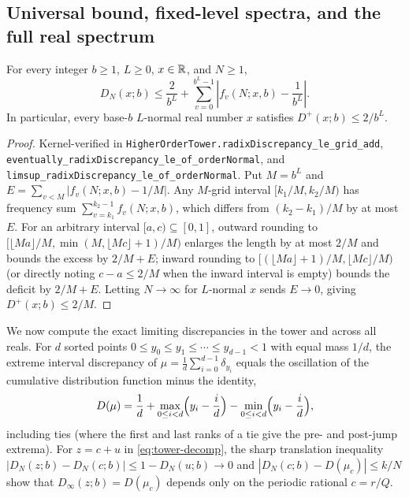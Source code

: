 \documentclass[11pt]{article}
\newcommand{\ttt}[1]{\texttt{#1}}
\begin{document}
\subsection{Universal bound, fixed-level spectra, and the full real spectrum}

\begin{theorem}\label{thm:universal-ceiling}
For every integer $b\ge1$, $L\ge0$, $x\in\mathbb R$, and $N\ge1$,
\[
D_N(x;b)\le\frac2{b^L}+\sum_{v=0}^{b^L-1}\left|f_v(N;x,b)-\frac1{b^L}\right|.
\]
In particular, every base-$b$ $L$-normal real number $x$ satisfies $D^+(x;b)\le 2/b^L$.
\end{theorem}

\begin{proof}
Kernel-verified in \ttt{HigherOrderTower.radixDiscrepancy\_le\_grid\_add}, \ttt{eventually\_radixDiscrepancy\_le\_of\_orderNormal}, and \ttt{limsup\_radixDiscrepancy\_le\_of\_orderNormal}. Put $M=b^L$ and $E=\sum_{v<M}|f_v(N;x,b)-1/M|$. Any $M$-grid interval $[k_1/M,k_2/M)$ has frequency sum $\sum_{v=k_1}^{k_2-1}f_v(N;x,b)$, which differs from $(k_2-k_1)/M$ by at most $E$. For an arbitrary interval $[a,c)\subseteq[0,1]$, outward rounding to $[\lfloor Ma\rfloor/M,\min(M,\lfloor Mc\rfloor+1)/M)$ enlarges the length by at most $2/M$ and bounds the excess by $2/M+E$; inward rounding to $[(\lfloor Ma\rfloor+1)/M,\lfloor Mc\rfloor/M)$ (or directly noting $c-a\le 2/M$ when the inward interval is empty) bounds the deficit by $2/M+E$. Letting $N\to\infty$ for $L$-normal $x$ sends $E\to0$, giving $D^+(x;b)\le 2/M$.
\end{proof}

We now compute the exact limiting discrepancies in the tower and across all reals. For $d$ sorted points $0\le y_0\le y_1\le\cdots\le y_{d-1}<1$ with equal mass $1/d$, the extreme interval discrepancy of $\mu=\frac1d\sum_{i=0}^{d-1}\delta_{y_i}$ equals the oscillation of the cumulative distribution function minus the identity,
\begin{equation}\label{eq:equal-atoms}
D(\mu)=\frac1d+\max_{0\le i<d}\Bigl(y_i-\frac id\Bigr)-\min_{0\le i<d}\Bigl(y_i-\frac id\Bigr),
\end{equation}
including ties (where the first and last ranks of a tie give the pre- and post-jump extrema). For $z=c+u$ in \eqref{eq:tower-decomp}, the sharp translation inequality $|D_N(z;b)-D_N(c;b)|\le 1-D_N(u;b)\to0$ and $|D_N(c;b)-D(\mu_c)|\le k/N$ show that $D_\infty(z;b)=D(\mu_c)$ depends only on the periodic rational $c=r/Q$.
\end{document}

